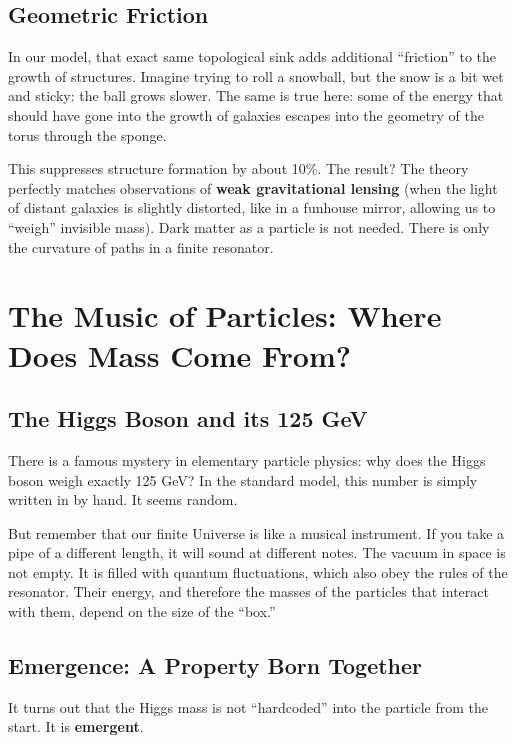 \documentclass[12pt,a4paper,oneside]{book}
\begin{document}
\section{Geometric Friction}

In our model, that exact same topological sink adds additional “friction” to the growth of structures. Imagine trying to roll a snowball, but the snow is a bit wet and sticky: the ball grows slower. The same is true here: some of the energy that should have gone into the growth of galaxies escapes into the geometry of the torus through the sponge.

This suppresses structure formation by about 10\%. The result? The theory perfectly matches observations of \textbf{weak gravitational lensing} (when the light of distant galaxies is slightly distorted, like in a funhouse mirror, allowing us to “weigh” invisible mass). Dark matter as a particle is not needed. There is only the curvature of paths in a finite resonator.

\chapter{The Music of Particles: Where Does Mass Come From?}

\section{The Higgs Boson and its 125 GeV}

There is a famous mystery in elementary particle physics: why does the Higgs boson weigh exactly 125 GeV? In the standard model, this number is simply written in by hand. It seems random.

But remember that our finite Universe is like a musical instrument. If you take a pipe of a different length, it will sound at different notes. The vacuum in space is not empty. It is filled with quantum fluctuations, which also obey the rules of the resonator. Their energy, and therefore the masses of the particles that interact with them, depend on the size of the “box.”

\section{Emergence: A Property Born Together}

It turns out that the Higgs mass is not “hardcoded” into the particle from the start. It is \textbf{emergent}.
\end{document}
